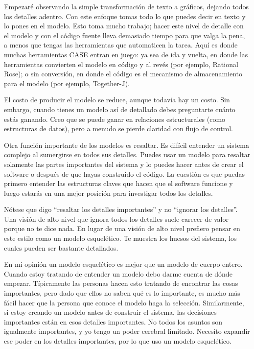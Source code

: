 \documentclass[twocolumn]{article}
\begin{document}
Empezaré observando la simple transformación de texto a gráficos, dejando todos los detalles adentro. Con este enfoque tomas todo lo que puedes decir en texto y lo pones en el modelo. Esto toma mucho trabajo; hacer este nivel de detalle con el modelo y con el código fuente lleva demasiado tiempo para que valga la pena, a menos que tengas las herramientas que automaticen la tarea. Aquí es donde muchas herramientas CASE entran en juego: ya sea de ida y vuelta, en donde las herramientas convierten el modelo en código y al revés (por ejemplo, Rational Rose); o sin conversión, en donde el código es el mecanismo de almacenamiento para el modelo (por ejemplo, Together-J).

El costo de producir el modelo se reduce, aunque todavía hay un costo. Sin embargo, cuando tienes un modelo así de detallado debes preguntarte cuánto estás ganando. Creo que se puede ganar en relaciones estructurales (como estructuras de datos), pero a menudo se pierde claridad con flujo de control.

Otra función importante de los modelos es resaltar. Es difícil entender un sistema complejo al sumergirse en todos sus detalles. Puedes usar un modelo para resaltar solamente las partes importantes del sistema y lo puedes hacer antes de crear el software o después de que hayas construido el código. La cuestión es que puedas primero entender las estructuras claves que hacen que el software funcione y luego estarás en una mejor posición para investigar todos los detalles.

Nótese que digo \textquotedblleft resaltar los detalles importantes\textquotedblright{} y no \textquotedblleft ignorar los detalles\textquotedblright . Una visión de alto nivel que ignora todos los detalles suele carecer de valor porque no te dice nada. En lugar de una visión de alto nivel prefiero pensar en este estilo como un modelo esquelético. Te muestra los huesos del sistema, los cuales pueden ser bastante detallados.

En mi opinión un modelo esquelético es mejor que un modelo de cuerpo entero. Cuando estoy tratando de entender un modelo debo darme cuenta de dónde empezar. Típicamente las personas hacen esto tratando de encontrar las cosas importantes, pero dado que ellos no saben qué es lo importante, es mucho más fácil hacer que la persona que conoce el modelo haga la selección. Similarmente, si estoy creando un modelo antes de construir el sistema, las decisiones importantes están en esos detalles importantes. No todos los asuntos son igualmente importantes, y yo tengo un poder cerebral limitado. Necesito expandir ese poder en los detalles importantes, por lo que uso un modelo esquelético.
\end{document}

